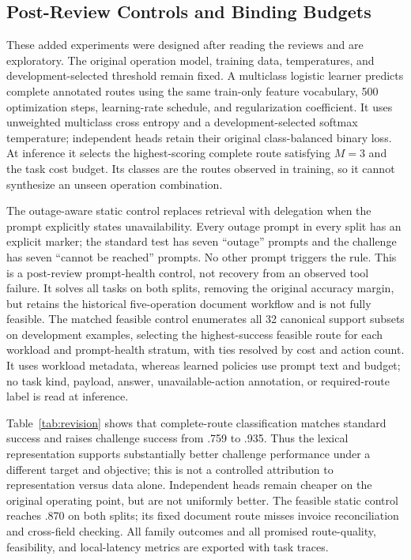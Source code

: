 \documentclass[letterpaper]{article} %
\begin{document}
\subsection{Post-Review Controls and Binding Budgets}

These added experiments were designed after reading the reviews and are exploratory. The original operation model, training data, temperatures, and development-selected threshold remain fixed. A multiclass logistic learner predicts complete annotated routes using the same train-only feature vocabulary, 500 optimization steps, learning-rate schedule, and regularization coefficient. It uses unweighted multiclass cross entropy and a development-selected softmax temperature; independent heads retain their original class-balanced binary loss. At inference it selects the highest-scoring complete route satisfying $M=3$ and the task cost budget. Its classes are the routes observed in training, so it cannot synthesize an unseen operation combination.

The outage-aware static control replaces retrieval with delegation when the prompt explicitly states unavailability. Every outage prompt in every split has an explicit marker; the standard test has seven ``outage'' prompts and the challenge has seven ``cannot be reached'' prompts. No other prompt triggers the rule. This is a post-review prompt-health control, not recovery from an observed tool failure. It solves all tasks on both splits, removing the original accuracy margin, but retains the historical five-operation document workflow and is not fully feasible. The matched feasible control enumerates all 32 canonical support subsets on development examples, selecting the highest-success feasible route for each workload and prompt-health stratum, with ties resolved by cost and action count. It uses workload metadata, whereas learned policies use prompt text and budget; no task kind, payload, answer, unavailable-action annotation, or required-route label is read at inference.



Table~\ref{tab:revision} shows that complete-route classification matches standard success and raises challenge success from .759 to .935. Thus the lexical representation supports substantially better challenge performance under a different target and objective; this is not a controlled attribution to representation versus data alone. Independent heads remain cheaper on the original operating point, but are not uniformly better. The feasible static control reaches .870 on both splits; its fixed document route misses invoice reconciliation and cross-field checking. All family outcomes and all promised route-quality, feasibility, and local-latency metrics are exported with task traces.
\end{document}
